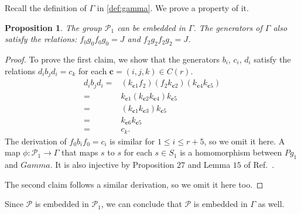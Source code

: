 \documentclass[11pt,letterpaper]{article}
\newcommand{\1}{\mathbb{1}}
\newcommand{\Pg}{\mathcal{P}}
\newcommand{\bc}{\pmb{c}}
\newtheorem{proposition}[theorem]{Proposition}
\theoremstyle{definition}
\begin{document}
Recall the definition of $\Gamma$ in \cref{def:gamma}. We prove a property of it.
\begin{proposition}
    \label{prop:g1gamma}
	The group $\Pg_1$ can be embedded in $\Gamma$.
	The generators of $\Gamma$ also satisfy the relations: $f_0 g_0 f_0 g_0 = J$ and $f_2 g_2 f_2 g_2 = J$.
\end{proposition}
\begin{proof}
    To prove the first claim, we show that the generators
    $b_i$, $c_i$, $d_i$ satisfy the relations
    $d_ib_jd_i = c_k$ for each $\bc = (i,j,k) \in C(r)$.
    \begin{align*}
        d_ib_jd_i =& (k_{\bc 1} f_2)(f_2 k_{\bc 2})(k_{\bc 4} k_{\bc 5})\\ 
        =& k_{\bc 1}(k_{\bc 2}k_{\bc 4})k_{\bc 5} \\
        =& (k_{\bc 1} k_{\bc 3}) k_{\bc 5} \\
        =& k_{\bc 6} k_{\bc 5} \\
        =& c_k.
    \end{align*}
    The derivation of $f_0 b_i f_0 = c_i$ is similar for $1 \leq i \leq r+5$, so we omit it here.
    A map $\phi:\Pg_1 \rightarrow \Gamma$ that maps $s$
    to $s$ for each $s \in S_1$ is a homomorphism between $Pg_1$ and 
    $Gamma$. It is also injective by Proposition $27$ and Lemma $15$ of 
    Ref.~\cite{slofstra2017}.
    
    The second claim follows a similar derivation, so we omit it here too.
\end{proof}
Since $\Pg$ is embedded in $\Pg_1$, we can conclude that
$\Pg$ is embedded in $\Gamma$ as well.
\end{document}
